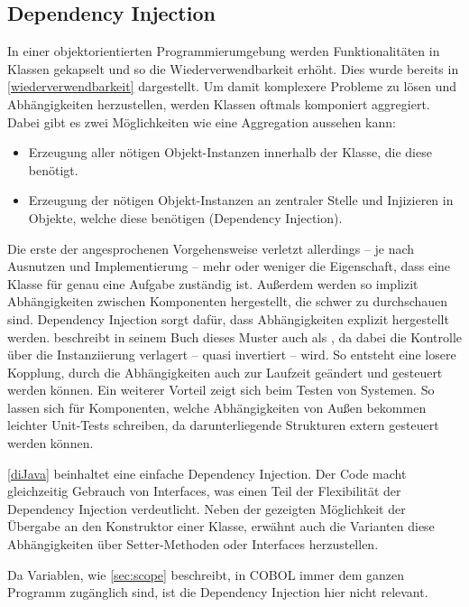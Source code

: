 \subsection{Dependency Injection}\label{depi}
In einer objektorientierten Programmierumgebung werden Funktionalitäten in Klassen gekapselt und so die Wiederverwendbarkeit erhöht. Dies wurde bereits in \autoref{wiederverwendbarkeit} dargestellt. Um damit komplexere Probleme zu lösen und Abhängigkeiten herzustellen, werden Klassen oftmals komponiert \bzw aggregiert. Dabei gibt es zwei Möglichkeiten wie eine Aggregation aussehen kann:

\begin{itemize}
    \item Erzeugung aller nötigen Objekt-Instanzen innerhalb der Klasse, die diese benötigt.
    \item Erzeugung der nötigen Objekt-Instanzen an zentraler Stelle und Injizieren in Objekte, welche diese benötigen (Dependency Injection). 
\end{itemize}

Die erste der angesprochenen Vorgehensweise verletzt allerdings -- je nach Ausnutzen und Implementierung -- mehr oder weniger die Eigenschaft, dass eine Klasse für genau eine Aufgabe zuständig ist. Außerdem werden so implizit Abhängigkeiten zwischen Komponenten hergestellt, die schwer zu durchschauen sind. Dependency Injection sorgt dafür, dass Abhängigkeiten explizit hergestellt werden. \citeauthor{martin_clean_2008} beschreibt in seinem Buch  dieses Muster auch als , da dabei die Kontrolle über die Instanziierung verlagert -- quasi invertiert -- wird. So entsteht eine losere Kopplung, durch die Abhängigkeiten auch zur Laufzeit geändert und gesteuert werden können. Ein weiterer Vorteil zeigt sich beim Testen von Systemen. So lassen sich für Komponenten, welche Abhängigkeiten von Außen bekommen leichter Unit-Tests schreiben, da darunterliegende Strukturen extern gesteuert werden können.


\autoref{diJava} beinhaltet eine einfache Dependency Injection. Der Code macht gleichzeitig Gebrauch von Interfaces, was einen Teil der Flexibilität der Dependency Injection verdeutlicht. Neben der gezeigten Möglichkeit der Übergabe an den Konstruktor einer Klasse, erwähnt \citeauthor{martin_clean_2008} \cite{martin_clean_2008} auch die Varianten diese Abhängigkeiten über Setter-Methoden oder Interfaces herzustellen.

Da Variablen, wie \autoref{sec:scope} beschreibt, in COBOL immer dem ganzen Programm zugänglich sind, ist die Dependency Injection hier nicht relevant.